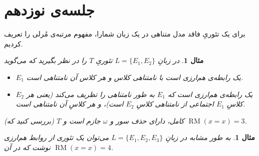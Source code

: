 \documentclass[12pt,a4paper]{report}
\theoremstyle{colorhead}
\newtheorem{mesal}[thm]{مثال}
\DeclareMathOperator{\RM}{RM}
\begin{document}
\section{جلسه‌ی نوزدهم}
برای یک تئوریِ 
فاقد مدل متناهی در یک زبان شمارا، مفهوم مرتبه‌ی مُرلی را تعریف کردیم.
\begin{mesal}
در زبانِ
$L=\{E_1,E_2\}$
تئوریِ
$T$
را در نظر بگیرید که می‌گوید
\begin{itemize}
\item
$E_1$
یک رابطه‌ی هم‌ارزی است با نامتناهی کلاس و هر کلاس آن نامتناهی است.
\item 
$E_2$
یک رابطه‌ی هم‌ارزی است که 
$E_1$
به طور نامتناهی
را تظریف می‌کند (یعنی هر کلاسِ
$E_1$
اجتماعی از نامتناهی کلاسِ
$E_2$
است)،‌ و هر کلاسِ
آن نامتناهی است.
\end{itemize}
(بررسی کنید که)
$T$
کامل، دارای حذف سور و 
$\omega$
جازم است و 
$\RM(x=x)=3$. 
\end{mesal}
\begin{mesal}
به طور مشابه در زبانِ
$L=\{E_1,E_2,E_3\}$
می‌توان یک تئوری از روابط هم‌ارزی نوشت که در آن
$\RM(x=x)=4$.
\end{mesal}
\end{document}

